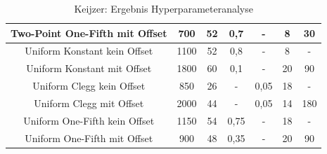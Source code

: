 \begin{table}[H]
\begin{tabular}{c | c | c | c | c | c | c}
		Two-Point One-Fifth mit Offset & 700 & 52 & 0,7 & - & 8 & 30 \\
		\hline
		Uniform Konstant kein Offset & 1100 & 52 & 0,8 & - & 8 & - \\
		\hline
		Uniform Konstant mit Offset & 1800 & 60 & 0,1 & - & 20 & 90 \\
		\hline
		Uniform Clegg kein Offset & 850 & 26 & - & 0,05 & 18 & - \\
		\hline
		Uniform Clegg mit Offset & 2000 & 44 & - & 0,05 & 14 & 180 \\
		\hline
		Uniform One-Fifth kein Offset & 1150 & 54 & 0,75 & - & 18 & - \\
		\hline
		Uniform One-Fifth mit Offset & 900 & 48 & 0,35 & - & 20 & 90 \\
	\end{tabular}
	\caption{Keijzer: Ergebnis Hyperparameteranalyse}
	\label{table:keijzerHPO}
\end{table}

